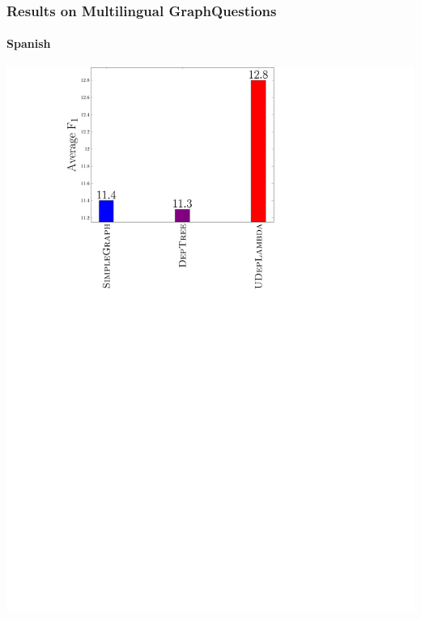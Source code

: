 \documentclass[mathserif,12pt]{beamer}
\begin{document}
\begin{frame}
\frametitle{Results on Multilingual GraphQuestions}
\framesubtitle{Spanish}
\centering
\large
\vspace{0.4em}
\includegraphics[trim=9.5em 0em 23em 0.5em,clip=true,scale=0.45]{figures/deplambda_results_plot_ud_gq-es}
\end{frame}
\end{document}
